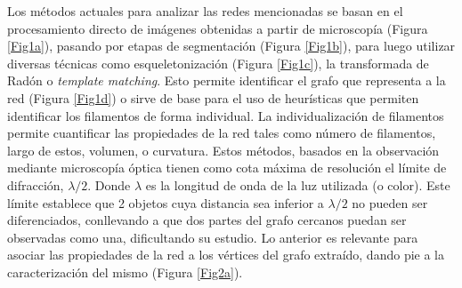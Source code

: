 \documentclass{article}
\begin{document}
\vspace{.5cm}
Los m\'etodos actuales para analizar las redes mencionadas se basan en el procesamiento directo de im\'agenes obtenidas a partir de microscop\'ia (Figura \ref{Fig1a}), pasando por etapas de segmentaci\'on (Figura \ref{Fig1b}), para luego utilizar diversas t\'ecnicas como esqueletonizaci\'on (Figura \ref{Fig1c}), la transformada de Rad\'on o {\it template matching}. Esto permite identificar el grafo que representa a la red (Figura \ref{Fig1d}) o sirve de base para el uso de heur\'isticas que permiten identificar los filamentos de forma individual.
La individualizaci\'on de filamentos permite cuantificar las propiedades de la red tales como n\'umero de filamentos, largo de estos, volumen, o curvatura. Estos m\'etodos, basados en la observaci\'on mediante microscop\'ia \'optica tienen como cota m\'axima de resoluci\'on el l\'imite de difracci\'on, $\lambda/2$. Donde $\lambda$ es la longitud de onda de la luz utilizada (o color). Este l\'imite establece que 2 objetos cuya distancia sea inferior a $\lambda/2$ no pueden ser diferenciados, conllevando a que dos partes del grafo cercanos puedan ser observadas como una, dificultando su estudio. Lo anterior es relevante para asociar las propiedades de la red a los v\'ertices del grafo extra\'ido, dando pie a la caracterizaci\'on del mismo (Figura \ref{Fig2a}).
 
\end{document}
